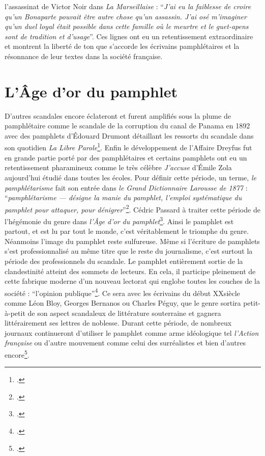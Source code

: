 l'assassinat de Victor Noir dans \textit{La Marseillaise} : \enquote{\textit{J'ai eu la faiblesse de croire qu'un Bonaparte pouvait être autre chose qu'un assassin. J'ai osé m'imaginer qu'un duel loyal était possible dans cette famille où le meurtre et le guet-apens sont de tradition et d'usage}}. Ces lignes ont eu un retentissement extraordinaire et montrent la liberté de ton que s'accorde les écrivains pamphlétaires et la résonnance de leur textes dans la société française.

\section{L'Âge d'or du pamphlet}

D'autres scandales encore éclateront et furent amplifiés sous la plume de pamphlétaire comme le scandale de la corruption du canal de Panama en 1892 avec des pamphlets d'Édouard Drumont détaillant les ressorts du scandale dans son quotidien \textit{La Libre Parole}\footcites{drumont_libre_1892}. Enfin le développement de l'Affaire Dreyfus fut en grande partie porté par des pamphlétaires et certains pamphlets ont eu un retentissement pharamineux comme le très célèbre \textit{J'accuse} d'Émile Zola aujourd'hui étudié dans toutes les écoles. Pour définir cette période, un terme, \textit{le pamphlétarisme} fait son entrée dans \textit{le Grand Dictionnaire Larousse de 1877} : \enquote{\textit{pamphlétarisme — désigne la manie du pamphlet, l'emploi systématique du pamphlet pour attaquer, pour dénigrer}}\footcites{larousse_grand_1866}. Cédric Passard à traiter cette période de l'hégémonie du genre dans \textit{l'Âge d'or du pamphlet}\footcites{passard_lage_2015}.
Ainsi le pamphlet est partout, et est lu par tout le monde, c'est véritablement le triomphe du genre. Néanmoins l'image du pamphlet reste sulfureuse. Même si l'écriture de pamphlets s'est professionnalisé au même titre que le reste du journalisme, c'est surtout la période des professionnels du scandale. Le pamphlet entièrement sortie de la clandestinité atteint des sommets de lecteurs. En cela, il participe pleinement de cette fabrique moderne d'un nouveau lectorat qui englobe toutes les couches de la société : \enquote{l'opinion publique}\footcites{farge_dire_1992}. Ce sera avec les écrivains du début XX\ieme siècle comme Léon Bloy, Georges Bernanos ou Charles Péguy, que le genre sortira petit-à-petit de son aspect scandaleux de littérature souterraine et gagnera littérairement ses lettres de noblesse. Durant cette période, de nombreux journaux continueront d'utiliser le pamphlet comme arme idéologique tel \textit{l'Action française} ou d'autre mouvement comme celui des surréalistes et bien d'autres encore\footcites{passard_pamphlet_2009}.

